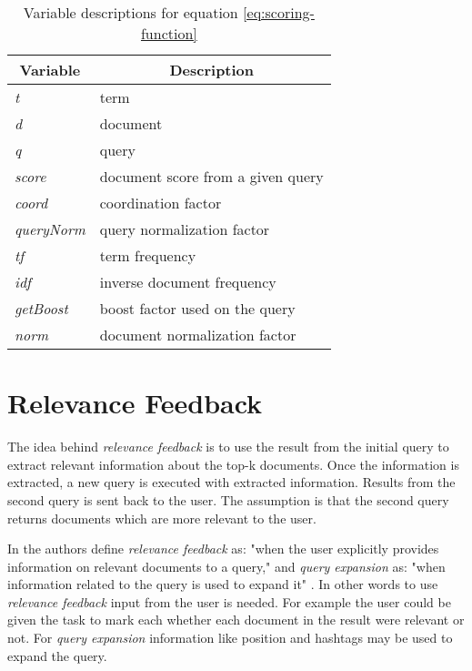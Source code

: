 \begin{table}
		\centering
    \begin{tabular}{|l|l|}
    \hline
		\multicolumn{1}{|c|}{\bfseries Variable} & \multicolumn{1}{c|}{\bfseries Description} \\ \hline
    \textit{t}         & term                           		\\ \hline
    \textit{d}         & document                       		\\ \hline
    \textit{q}         & query                          		\\ \hline
		\textit{score}     & document score from a given query	\\ \hline
    \textit{coord}     & coordination factor            		\\ \hline
    \textit{queryNorm} & query normalization factor     		\\ \hline
    \textit{tf}        & term frequency                 		\\ \hline
    \textit{idf}       & inverse document frequency     		\\ \hline
    \textit{getBoost}  & boost factor used on the query 		\\ \hline
    \textit{norm}      & document normalization factor  		\\ \hline
    \end{tabular}
		\caption{Variable descriptions for equation \ref{eq:scoring-function}}
		\label{tbl:scoring-function}
\end{table}

\section{Relevance Feedback}
The idea behind \textit{relevance feedback} is to use the result from the initial query to extract relevant information about the top-k documents.
Once the information is extracted, a new query is executed with extracted information.
Results from the second query is sent back to the user.
The assumption is that the second query returns documents which are more relevant to the user.

In \cite{ir-book} the authors define \textit{relevance feedback} as: "when the user explicitly provides information on relevant documents to a query,"
and \textit{query expansion} as: "when information related to the query is used to expand it" \cite[p. 177]{ir-book}.
In other words to use \textit{relevance feedback} input from the user is needed.
For example the user could be given the task to mark each whether each document in the result were relevant or not.
For \textit{query expansion} information like position and hashtags may be used to expand the query.


